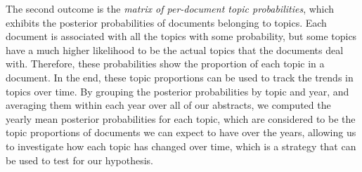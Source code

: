 The second outcome is the \textit{matrix of per-document topic probabilities}, which exhibits the posterior probabilities of documents belonging to topics. Each document is associated with all the topics with some probability, but some topics have a much higher likelihood to be the actual topics that the documents deal with. Therefore, these probabilities show the proportion of each topic in a document. In the end, these topic proportions can be used to track the trends in topics over time. By grouping the posterior probabilities by topic and year, and averaging them within each year over all of our abstracts, we computed the yearly mean posterior probabilities for each topic, which are considered to be the topic proportions of documents we can expect to have over the years, allowing us to investigate how each topic has changed over time, which is a strategy that can be used to test for our hypothesis.